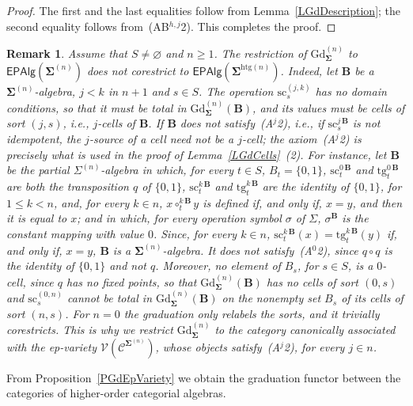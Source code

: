 \documentclass[a4paper, reqno]{amsbook}
\newcommand{\sig}[1]{\mathbf{#1}}             %
\newcommand{\spec}[1]{\boldsymbol{\mathcal{#1}}} %
\newcommand{\htg}{\mathrm{htg}}                %
\newcommand{\src}{\mathrm{sc}}
\newcommand{\tgt}{\mathrm{tg}}
\newcommand{\Gd}{\mathrm{Gd}}
\theoremstyle{plain}
\newtheorem{remark}[theorem]{Remark}
\theoremstyle{definition}
\begin{document}
\begin{proof}
The first and the last equalities follow from Lemma~\ref{LGdDescription}; the second equality follows from~(AB$^{h,j}$2). This completes the proof.
\end{proof}

\begin{remark}\label{RGdNotEpAlg}
Assume that $S\neq\varnothing$ and $n\geq 1$.
The restriction of $\Gd^{(n)}_{\sig{\Sigma}}$ to $\mathsf{EPAlg}(\sig{\Sigma}^{(n)})$ does not corestrict to $\mathsf{EPAlg}(\sig{\Sigma}^{\htg(n)})$.
Indeed, let $\mathbf{B}$ be a $\sig{\Sigma}^{(n)}$-algebra, $j<k$ in $n+1$ and $s\in S$.
The operation $\src^{(j,k)}_{s}$ has no domain conditions, so that it must be total in $\Gd^{(n)}_{\sig{\Sigma}}(\mathbf{B})$, and its values must be cells of sort $(j,s)$, i.e., $j$-cells of $\mathbf{B}$.
If $\mathbf{B}$ does not satisfy~(A$^{j}$2), i.e., if $\src^{j\,\mathbf{B}}_{s}$ is not idempotent, the $j$-source of a cell need not be a $j$-cell; the axiom~(A$^{j}$2) is precisely what is used in the proof of Lemma~\ref{LGdCells}~(2).
For instance, let $\mathbf{B}$ be the partial $\Sigma^{(n)}$-algebra in which, for every $t\in S$, $B_{t}=\{0,1\}$, $\src^{0\,\mathbf{B}}_{t}$ and $\tgt^{0\,\mathbf{B}}_{t}$ are both the transposition $q$ of $\{0,1\}$, $\src^{k\,\mathbf{B}}_{t}$ and $\tgt^{k\,\mathbf{B}}_{t}$ are the identity of $\{0,1\}$, for $1\leq k<n$, and, for every $k\in n$, $x\circ^{k\,\mathbf{B}}_{t}y$ is defined if, and only if, $x=y$, and then it is equal to $x$; and in which, for every operation symbol $\sigma$ of $\Sigma$, $\sigma^{\mathbf{B}}$ is the constant mapping with value $0$.
Since, for every $k\in n$, $\src^{k\,\mathbf{B}}_{t}(x)=\tgt^{k\,\mathbf{B}}_{t}(y)$ if, and only if, $x=y$, $\mathbf{B}$ is a $\sig{\Sigma}^{(n)}$-algebra.
It does not satisfy~(A$^{0}$2), since $q\circ q$ is the identity of $\{0,1\}$ and not $q$.
Moreover, no element of $B_{s}$, for $s\in S$, is a $0$-cell, since $q$ has no fixed points, so that $\Gd^{(n)}_{\sig{\Sigma}}(\mathbf{B})$ has no cells of sort $(0,s)$ and $\src^{(0,n)}_{s}$ cannot be total in $\Gd^{(n)}_{\sig{\Sigma}}(\mathbf{B})$ on the nonempty set $B_{s}$ of its cells of sort $(n,s)$.
For $n=0$ the graduation only relabels the sorts, and it trivially corestricts.
This is why we restrict $\Gd^{(n)}_{\sig{\Sigma}}$ to the category canonically associated with the ep-variety $\mathcal{V}(\spec{C}^{\sig{\Sigma}^{(n)}})$, whose objects satisfy~(A$^{j}$2), for every $j\in n$.
\end{remark}

From Proposition~\ref{PGdEpVariety} we obtain the graduation functor between the categories of higher-order categorial algebras.
\end{document}
